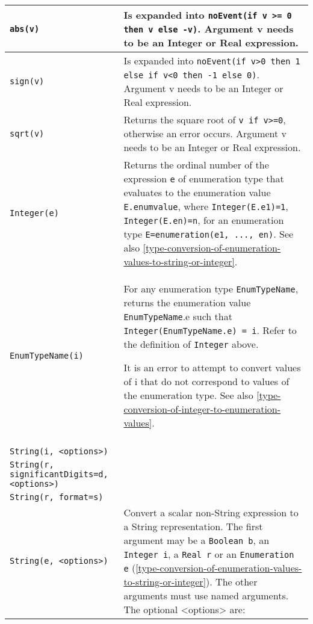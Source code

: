\begin{longtable}{|p{4.5cm}|p{10cm}|} \hline
\endhead
\lstinline!abs(v)! & Is expanded into \lstinline!noEvent(if v >= 0 then v else -v)!. Argument v needs to be an Integer or Real expression.\\ \hline
\lstinline!sign(v)! & Is expanded into \lstinline!noEvent(if v>0 then 1 else if v<0 then -1 else 0)!. Argument v needs to be an Integer or Real
expression.\\ \hline
\lstinline!sqrt(v)! & Returns the square root of \lstinline!v if v>=0!, otherwise
an error occurs. Argument v needs to be an Integer or Real
expression.\\ \hline

\lstinline!Integer(e)! & Returns the ordinal number of the expression \lstinline!e! of
enumeration type that evaluates to the enumeration value \lstinline!E.enumvalue!,
where \lstinline!Integer(E.e1)=1!, \lstinline!Integer(E.en)=n!, for an enumeration type
\lstinline!E=enumeration(e1, ..., en)!. See also \autoref{type-conversion-of-enumeration-values-to-string-or-integer}.\\ \hline
\lstinline!EnumTypeName(i)! &
For any enumeration type \lstinline!EnumTypeName!, returns the enumeration
value \lstinline!EnumTypeName!.e such that \lstinline!Integer(EnumTypeName.e) = i!. Refer to the definition of
\lstinline!Integer! above.

It is an error to attempt to convert values of i that do not correspond
to values of the enumeration type. See also \autoref{type-conversion-of-integer-to-enumeration-values}.
\\ \hline

\begin{tabular}{@{}p{4.5cm}@{}}
\lstinline!String(b, <options>)!\\
\lstinline!String(i, <options>)!\\
\lstinline!String(r,!
\hspace*{1ex}\lstinline!significantDigits=d,!
\hspace*{1ex}\lstinline!<options>)!\\
\lstinline!String(r, format=s)!\\
\lstinline!String(e, <options>)!
\end{tabular}
&
Convert a scalar non-String expression to a String representation. The
first argument may be a \lstinline!Boolean b!, an \lstinline!Integer i!, a \lstinline!Real r! or an
\lstinline!Enumeration e! (\autoref{type-conversion-of-enumeration-values-to-string-or-integer}). The other arguments must use named
arguments. The optional \textless{}options\textgreater{} are:


\end{longtable}
